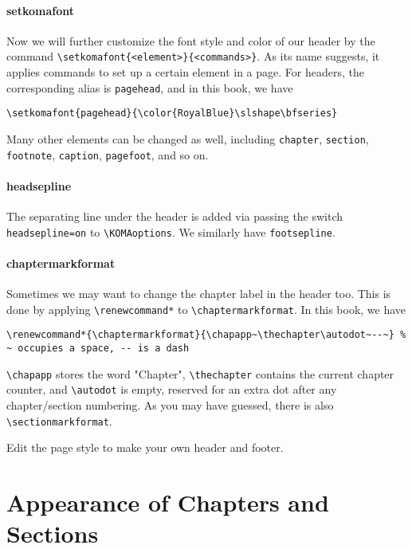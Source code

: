 \paragraph{setkomafont}
Now we will further customize the font style and color of our header by the command \texttt{\textbackslash setkomafont\{<element>\}\{<commands>\}}. As its name suggests, it applies commands to set up a certain element in a page. For headers, the corresponding alias is \texttt{pagehead}, and in this book, we have
\begin{lstlisting}
\setkomafont{pagehead}{\color{RoyalBlue}\slshape\bfseries}    
\end{lstlisting}
Many other elements can be changed as well, including \texttt{chapter}, \texttt{section}, \texttt{footnote}, \texttt{caption}, \texttt{pagefoot}, and so on.

\paragraph{headsepline}
The separating line under the header is added via passing the switch \texttt{headsepline=on} to \texttt{\textbackslash KOMAoptions}. We similarly have \texttt{footsepline}.

\paragraph{chaptermarkformat}
Sometimes we may want to change the chapter label in the header too. This is done by applying \texttt{\textbackslash renewcommand*} to \texttt{\textbackslash chaptermarkformat}. In this book, we have
\begin{lstlisting}
\renewcommand*{\chaptermarkformat}{\chapapp~\thechapter\autodot~--~} % ~ occupies a space, -- is a dash
\end{lstlisting}
\texttt{\textbackslash chapapp} stores the word "Chapter", \texttt{\textbackslash thechapter} contains the current chapter counter, and \texttt{\textbackslash autodot} is empty, reserved for an extra dot after any chapter/section numbering. As you may have guessed, there is also \texttt{\textbackslash sectionmarkformat}.

\begin{exercisebox}
\begin{Exercise}
Edit the page style to make your own header and footer.
\end{Exercise}
\end{exercisebox}

\section{Appearance of Chapters and Sections}

